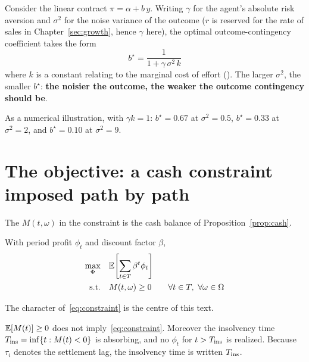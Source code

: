 \begin{example}
\label{ex:bstar}
Consider the linear contract $\pi = \alpha + b\,y$. Writing $\gamma$ for the agent's
absolute risk aversion and $\sigma^2$ for the noise variance of the outcome
($r$ is reserved for the rate of sales in Chapter~\ref{sec:growth}, hence $\gamma$ here),
the optimal outcome-contingency coefficient takes the form
\begin{equation}
b^{\star} = \frac{1}{1+\gamma\,\sigma^{2}\,k}
\label{eq:bstar}
\end{equation}
where $k$ is a constant relating to the marginal cost of effort (\cite{holmstrom1991}).
The larger $\sigma^2$, the smaller $b^\star$: \textbf{the noisier the outcome, the weaker
the outcome contingency should be}.

As a numerical illustration, with $\gamma k = 1$: $b^\star=0.67$ at $\sigma^2=0.5$,
$b^\star=0.33$ at $\sigma^2=2$, and $b^\star=0.10$ at $\sigma^2=9$.
\end{example}

\section{The objective: a cash constraint imposed path by path}
\label{sec:objective}

The $M(t,\omega)$ in the constraint is the cash balance of Proposition~\ref{prop:cash}.

\begin{definition}
With period profit $\phi_t$ and discount factor $\beta$,
\begin{align}
\max_{\Phi}\quad & \E\!\left[\sum_{t\in T}\beta^{t}\phi_t\right] \label{eq:obj}\\
\text{s.t.}\quad & M(t,\omega)\geq 0 \qquad \forall t\in T,\ \forall\omega\in\Omega \label{eq:constraint}
\end{align}
\end{definition}

The character of~\eqref{eq:constraint} is the centre of this text.

\begin{proposition}
\label{prop:pathwise}
$\mathbb{E}[M(t)]\geq 0$ does not imply~\eqref{eq:constraint}. Moreover the insolvency time
$T_{\mathrm{ins}}=\inf\{t: M(t)<0\}$ is absorbing, and no $\phi_t$ for $t>T_{\mathrm{ins}}$ is realized.
Because $\tau_i$ denotes the settlement lag, the insolvency time is written $T_{\mathrm{ins}}$.
\end{proposition}


